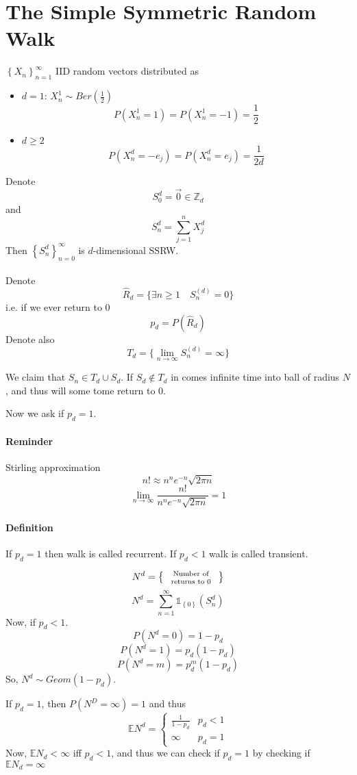 \section{The Simple Symmetric Random Walk}
$\left\{ X_n \right\}_{n=1}^\infty$ IID random vectors distributed as
\begin{itemize}
	\item $d=1$: $X^1_n \sim Ber\left(\frac{1}{2}\right)$ $$P\left(X^1_n = 1\right)=P\left(X^1_n = -1\right)=\frac{1}{2}$$
	\item $d\geq 2$ $$P(X^d_n = -e_j) = P(X^d_n = e_j) = \frac{1}{2d}$$
\end{itemize}

Denote $$S^d_0 =\vec{0}\in \mathbb{Z}_d$$ and $$S^d_n = \sum_{j=1}^n X^d_j$$
Then $\left\{  S^d_n \right\}_{n=0}^\infty$ is $d$-dimensional SSRW.

\paragraph{}
Denote $$\hat{R}_{d} = \bigg\{ \exists n\geq 1 \quad S_n^{(d)} = 0 \bigg\}$$
i.e. if we ever return to $0$
$$p_d = P(\hat{R}_{d})$$
Denote also
$$T_d = \bigg\{ \lim_{n \to \infty} S_n^{(d)} = \infty \bigg\}$$

We claim that $S_n \in T_d \cup S_d$. If $S_d \notin T_d$ in comes infinite time into ball of radius $N$, and thus will some tome return to $0$.

Now we ask if $p_d = 1$.

\paragraph{Reminder} Stirling approximation
$$n! \approx n^n e^{-n} \sqrt{2\pi n}$$
$$\lim_{n \to \infty} \frac{n!}{n^n e^{-n} \sqrt{2\pi n}} = 1$$
\paragraph{Definition}
If $p_d = 1$ then walk is called recurrent. If $p_d<1$ walk is called transient.

$$N^d = \left\{ \parbox{2cm}{\scriptsize \centering Number of returns to 0} \right\}$$
$$N^d = \sum_{n=1}^\infty \mathds{1}_{\left\{0 \right\}} \left(S_n^d\right)$$
Now, if $p_d < 1$.
$$P(N^d=0) = 1-p_d$$
$$P(N^d=1) = p_d(1-p_d)$$
$$P(N^d=m) = p_d^m(1-p_d)$$
So, $N^d \sim Geom(1-p_d)$.

If $p_d=1$, then $P(N^D = \infty) = 1$ and thus
$$\mathbb{E} N^d = \begin{cases}
\frac{1}{1-p_d} & p_d <1\\\infty & p_d = 1
\end{cases}$$
Now, $\mathbb{E} N_d < \infty$ iff $p_d < 1$, and thus we can check if $p_d=1$ by checking if  $\mathbb{E} N_d = \infty$


